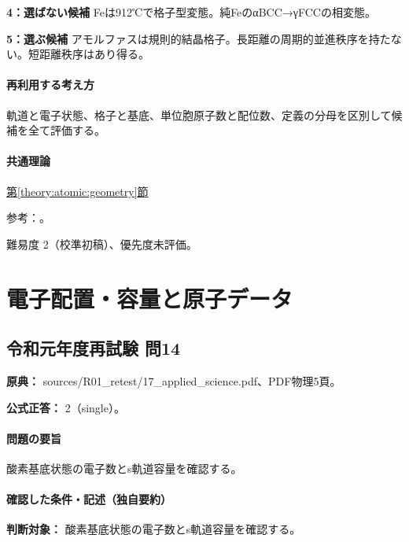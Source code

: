 \noindent\textbf{4：選ばない候補} Feは912℃で格子型変態。純FeのαBCC→γFCCの相変態。\par

\noindent\textbf{5：選ぶ候補} アモルファスは規則的結晶格子。長距離の周期的並進秩序を持たない。短距離秩序はあり得る。\par

\paragraph{再利用する考え方} 軌道と電子状態、格子と基底、単位胞原子数と配位数、定義の分母を区別して候補を全て評価する。

\paragraph{共通理論} \hyperref[theory:atomic:geometry]{第\ref*{theory:atomic:geometry}節}

\par 参考：\cite{princeton_iron,princeton_tungsten,openstax_crystals}。

\par 難易度 2（校準初稿）、優先度未評価。

\section{電子配置・容量と原子データ}

\subsection{令和元年度再試験 問14}
\label{q:r01-ret-applied-14}

\noindent\textbf{原典：} sources/R01\_retest/17\_applied\_science.pdf、PDF物理5頁。

\textbf{公式正答：} 2（single）。

\paragraph{問題の要旨} 酸素基底状態の電子数とs軌道容量を確認する。

\paragraph{確認した条件・記述（独自要約）}\mbox{}\par

\noindent\textbf{判断対象：} 酸素基底状態の電子数とs軌道容量を確認する。\par

